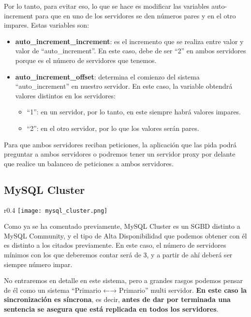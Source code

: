 Por lo tanto, para evitar eso, lo que se hace es modificar las variables auto-increment para que en uno de los servidores se den números pares y en el otro impares.  Estas variables son:


\begin{itemize}
    \item \textbf{auto\_increment\_increment}: es el incremento que se realiza entre valor y valor de “auto\_increment”. En este caso, debe de ser “2” en ambos servidores porque es el número de servidores que tenemos.
    \item \textbf{auto\_increment\_offset}: determina el comienzo del sistema “auto\_increment” en nuestro servidor. En este caso, la variable obtendrá valores distintos en los servidores:
    \begin{itemize}
        \item “1”: en un servidor, por lo tanto, en este siempre habrá valores impares.
        \item “2”: en el otro servidor, por lo que los valores serán pares.
    \end{itemize}
\end{itemize}


Para que ambos servidores reciban peticiones, la aplicación que las pida podrá preguntar a ambos servidores o podremos tener un servidor proxy por delante que realice un balanceo de peticiones a ambos servidores.



\subsection{MySQL Cluster}
\begin{wrapfigure}{r}{0.4\linewidth}
    \centering
    \vspace{-50pt}
    \texttt{[image: mysql\_cluster.png]}
    \vspace{-50pt}
\end{wrapfigure}
Como ya se ha comentado previamente, MySQL Cluster es un SGBD distinto a MySQL Community, y el tipo de Alta Disponibilidad que podemos obtener con él es distinto a los citados previamente. En este caso, el número de servidores mínimos con los que deberemos contar será de 3, y a partir de ahí deberá ser siempre número impar.

No entraremos en detalle en este sistema, pero a grandes rasgos podemos pensar de él como un sistema “Primario ←→ Primario” multi servidor. \textbf{En este caso la sincronización es síncrona}, es decir, \textbf{antes de dar por terminada una sentencia se asegura que está replicada en todos los servidores}.


